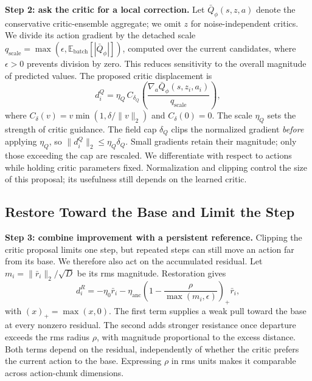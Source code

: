 \textbf{Step 2: ask the critic for a local correction.}
Let $\bar Q_\phi(s,z,a)$ denote the conservative critic-ensemble aggregate;
we omit $z$ for noise-independent critics. We divide its action gradient
by the detached scale
$q_{\mathrm{scale}}=\max(\epsilon,\mathbb{E}_{\mathrm{batch}}[|\bar Q_\phi|])$,
computed over the current candidates, where $\epsilon>0$ prevents division
by zero. This reduces sensitivity to the overall magnitude of predicted
values. The proposed critic displacement is
\begin{equation}
  d_i^Q=\eta_Q\,C_{\delta_Q}\!\left(
    \frac{\nabla_a\bar Q_\phi(s,z_i,a_i)}{q_{\mathrm{scale}}}
  \right),
  \label{eq:reward-step}
\end{equation}
where $C_\delta(v)=v\min(1,\delta/\|v\|_2)$ and $C_\delta(0)=0$.
The scale $\eta_Q$ sets the strength of critic guidance. The field cap
$\delta_Q$ clips the normalized gradient \emph{before} applying $\eta_Q$,
so $\|d_i^Q\|_2\leq\eta_Q\delta_Q$. Small gradients retain their
magnitude; only those exceeding the cap are rescaled. We differentiate
with respect to actions while holding critic parameters fixed.
Normalization and clipping control the size of this proposal; its
usefulness still depends on the learned critic.

\subsection{Restore Toward the Base and Limit the Step}
\label{sec:anchor}

\textbf{Step 3: combine improvement with a persistent reference.}
Clipping the critic proposal limits one step, but repeated steps can still
move an action far from its base. We therefore also act on the accumulated
residual. Let~\mbox{$m_i=\|\bar r_i\|_2/\sqrt{D}$} be its rms magnitude. Restoration gives
\begin{equation}
  d_i^R=-\eta_0\bar r_i
        -\eta_{\mathrm{anc}}
        \left(1-\frac{\rho}{\max(m_i,\epsilon)}\right)_{+}\bar r_i,
  \label{eq:restoring-step}
\end{equation}
with $(x)_+=\max(x,0)$. The first term supplies a weak pull toward the
base at every nonzero residual. The second adds stronger resistance once
departure exceeds the rms radius $\rho$, with magnitude proportional to
the excess distance. Both terms depend on the residual, independently of
whether the critic prefers the current action to the base. Expressing
$\rho$ in rms units makes it comparable across action-chunk dimensions.

